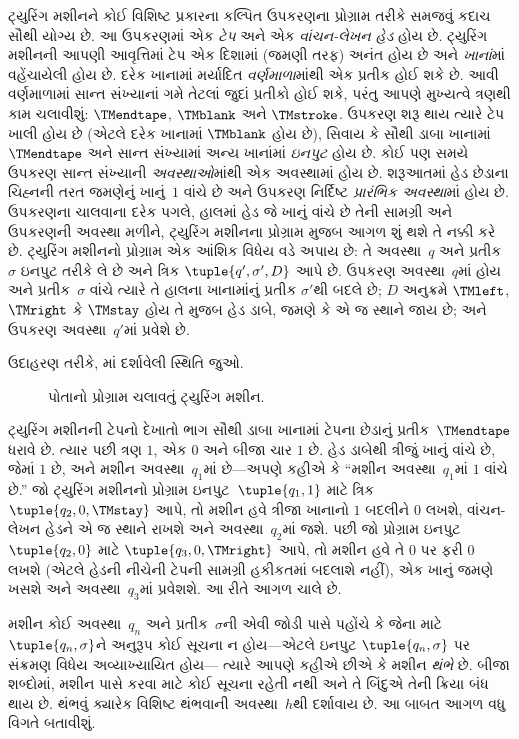 \begin{explain}
ટ્યુરિંગ મશીનને કોઈ વિશિષ્ટ પ્રકારના કલ્પિત ઉપકરણના પ્રોગ્રામ
તરીકે સમજવું કદાચ સૌથી યોગ્ય છે. આ ઉપકરણમાં એક \emph{ટેપ} અને
એક \emph{વાંચન-લેખન હેડ} હોય છે. ટ્યુરિંગ મશીનની આપણી આવૃત્તિમાં
ટેપ એક દિશામાં (જમણી તરફ) અનંત હોય છે અને \emph{ખાનાં}માં
વહેંચાયેલી હોય છે. દરેક ખાનામાં મર્યાદિત \emph{વર્ણમાળા}માંથી
એક પ્રતીક હોઈ શકે છે. આવી વર્ણમાળામાં સાન્ત સંખ્યાનાં ગમે તેટલાં જુદાં પ્રતીકો
હોઈ શકે, પરંતુ આપણે મુખ્યત્વે ત્રણથી કામ ચલાવીશું:
$\TMendtape$, $\TMblank$ અને $\TMstroke$. ઉપકરણ શરૂ થાય ત્યારે
ટેપ ખાલી હોય છે (એટલે દરેક ખાનામાં $\TMblank$ હોય છે), સિવાય કે
સૌથી ડાબા ખાનામાં $\TMendtape$ અને સાન્ત સંખ્યામાં અન્ય ખાનાંમાં
\emph{ઇનપુટ} હોય છે. કોઈ પણ સમયે ઉપકરણ સાન્ત સંખ્યાની
\emph{અવસ્થાઓ}માંથી એક અવસ્થામાં હોય છે. શરૂઆતમાં હેડ છેડાના
ચિહ્નની તરત જમણેનું ખાનું~$1$ વાંચે છે અને ઉપકરણ નિર્દિષ્ટ \emph{પ્રારંભિક અવસ્થા}માં
હોય છે. ઉપકરણના ચાલવાના દરેક પગલે, હાલમાં હેડ જે ખાનું વાંચે
છે તેની સામગ્રી અને ઉપકરણની અવસ્થા મળીને, ટ્યુરિંગ મશીનના
પ્રોગ્રામ મુજબ આગળ શું થશે તે નક્કી કરે છે. ટ્યુરિંગ મશીનનો
પ્રોગ્રામ એક આંશિક વિધેય વડે અપાય છે: તે અવસ્થા~$q$ અને
પ્રતીક~$\sigma$ ઇનપુટ તરીકે લે છે અને ત્રિક
$\tuple{q', \sigma', D}$ આપે છે. ઉપકરણ અવસ્થા~$q$માં હોય અને
પ્રતીક~$\sigma$ વાંચે ત્યારે તે હાલના ખાનામાંનું પ્રતીક
$\sigma'$થી બદલે છે; $D$ અનુક્રમે $\TMleft$, $\TMright$ કે
$\TMstay$ હોય તે મુજબ હેડ ડાબે, જમણે કે એ જ સ્થાને જાય છે;
અને ઉપકરણ અવસ્થા~$q'$માં પ્રવેશે છે.

ઉદાહરણ તરીકે, માં દર્શાવેલી સ્થિતિ જુઓ.
\begin{figure}
  \caption{પોતાનો પ્રોગ્રામ ચલાવતું ટ્યુરિંગ મશીન.}
\end{figure}
ટ્યુરિંગ મશીનની ટેપનો દેખાતો ભાગ સૌથી ડાબા ખાનામાં ટેપના
છેડાનું પ્રતીક~$\TMendtape$ ધરાવે છે. ત્યાર પછી ત્રણ $1$,
એક $0$ અને બીજા ચાર $1$ છે. હેડ ડાબેથી ત્રીજું ખાનું વાંચે
છે, જેમાં $1$ છે, અને મશીન અવસ્થા~$q_1$માં છે---અપણે કહીએ
કે ``મશીન અવસ્થા~$q_1$માં $1$ વાંચે છે.'' જો ટ્યુરિંગ મશીનનો
પ્રોગ્રામ ઇનપુટ~$\tuple{q_1, 1}$ માટે ત્રિક
$\tuple{q_2, 0, \TMstay}$ આપે, તો મશીન હવે ત્રીજા ખાનાનો
$1$ બદલીને $0$ લખશે, વાંચન-લેખન હેડને એ જ સ્થાને રાખશે અને
અવસ્થા~$q_2$માં જશે. પછી જો પ્રોગ્રામ ઇનપુટ~$\tuple{q_2, 0}$
માટે $\tuple{q_3, 0, \TMright}$ આપે, તો મશીન હવે તે $0$ પર
ફરી $0$ લખશે (એટલે હેડની નીચેની ટેપની સામગ્રી હકીકતમાં
બદલાશે નહીં), એક ખાનું જમણે ખસશે અને અવસ્થા~$q_3$માં
પ્રવેશશે. આ રીતે આગળ ચાલે છે.

મશીન કોઈ અવસ્થા~$q_n$ અને પ્રતીક~$\sigma$ની એવી જોડી પાસે
પહોંચે કે જેના માટે $\tuple{q_n, \sigma}$ને અનુરૂપ કોઈ સૂચના
ન હોય---એટલે ઇનપુટ $\tuple{q_n,\sigma}$ પર સંક્રમણ વિધેય
અવ્યાખ્યાયિત હોય---
ત્યારે આપણે કહીએ છીએ કે મશીન \emph{થંભે} છે. બીજા શબ્દોમાં,
મશીન પાસે કરવા માટે કોઈ સૂચના રહેતી નથી અને તે બિંદુએ તેની
ક્રિયા બંધ થાય છે. થંભવું ક્યારેક વિશિષ્ટ થંભવાની
અવસ્થા~$h$થી દર્શાવાય છે. આ બાબત આગળ વધુ વિગતે બતાવીશું.
\end{explain}

